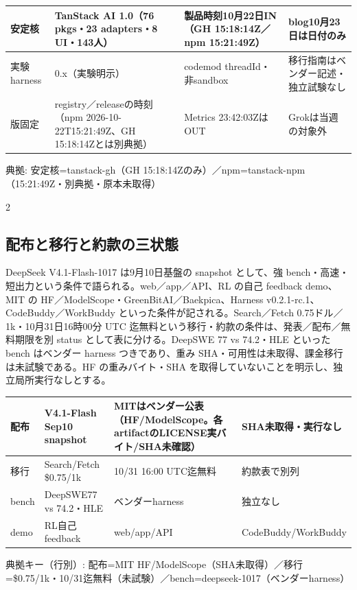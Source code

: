 \documentclass[lualatex,a4paper,10pt]{jlreq}
\begin{document}
{\centering\footnotesize
{}
\begin{tabularx}{0.96\linewidth}{@{}lXXX@{}}
\toprule
安定核 & TanStack AI 1.0（76 pkgs・23 adapters・8 UI・143人） & 製品時刻10月22日IN（GH 15:18:14Z／npm 15:21:49Z） & blog10月23日は日付のみ \\
\midrule
実験harness & 0.x（実験明示） & codemod threadId・非sandbox & 移行指南はベンダー記述・独立試験なし \\
版固定 & registry／releaseの時刻（npm 2026-10-22T15:21:49Z、GH 15:18:14Zとは別典拠） & Metrics 23:42:03ZはOUT & Grokは当週の対象外 \\
\bottomrule
\end{tabularx}
{\scriptsize\color{SurveyMuted} 典拠: 安定核=tanstack-gh（GH 15:18:14Zのみ）／npm=tanstack-npm（15:21:49Z・別典拠・原本未取得）\par}
} %
\begin{multicols}{2} %


\subsection*{配布と移行と約款の三状態}


DeepSeek V4.1-Flash-1017 は9月10日基盤の snapshot として、強 bench・高速・短出力という条件で語られる。web／app／API、RL の自己 feedback demo、MIT の HF／ModelScope・GreenBitAI／Baekpica、Harness v0.2.1-rc.1、CodeBuddy／WorkBuddy といった条件が記される。Search／Fetch 0.75ドル／1k・10月31日16時00分 UTC 迄無料という移行・約款の条件は、発表／配布／無料期限を別 status として表に分ける。DeepSWE 77 vs 74.2・HLE といった bench はベンダー harness つきであり、重み SHA・可用性は未取得、課金移行は未試験である。HF の重みバイト・SHA を取得していないことを明示し、独立局所実行なしとする。


\end{multicols} %
{\centering\footnotesize
{}
\begin{tabularx}{0.96\linewidth}{@{}lXXX@{}}
\toprule
配布 & V4.1-Flash Sep10 snapshot & MITはベンダー公表（HF/ModelScope。各artifactのLICENSE実バイト/SHA未確認） & SHA未取得・実行なし \\
\midrule
移行 & Search/Fetch \$0.75/1k & 10/31 16:00 UTC迄無料 & 約款表で別列 \\
bench & DeepSWE77 vs 74.2・HLE & ベンダーharness & 独立なし \\
demo & RL自己feedback & web/app/API & CodeBuddy/WorkBuddy \\
\bottomrule
\end{tabularx}
{\scriptsize\color{SurveyMuted} 典拠キー（行別）: 配布=MIT HF/ModelScope（SHA未取得）／移行=\$0.75/1k・10/31迄無料（未試験）／bench=deepseek-1017（ベンダーharness）\par}
} %
\end{document}
